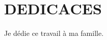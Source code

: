 \chapter*{DEDICACES}
\thispagestyle{MyStyle}
%
\begin{center}
\vspace{5cm}
Je dédie ce travail à ma famille.\\

\end{center}
